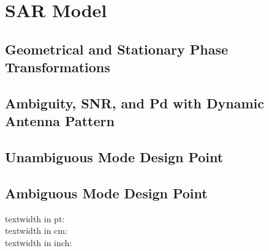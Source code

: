 \documentclass[11pt, a4paper]{scrartcl}
\begin{document}
    \section{SAR Model}
    \label{sec:sar_model}

    \subsection{Geometrical and Stationary Phase Transformations}
    \label{subsec:transformations}

    \subsection{Ambiguity, SNR, and Pd with Dynamic Antenna Pattern}
    \label{subsec:ambiguity_snr_pd_with_dynamic_antenna_pattern}

    \subsection{Unambiguous Mode Design Point}
    \label{subsec:unambiguous_mode_design_point}

    \subsection{Ambiguous Mode Design Point}
    \label{subsec:ambiguous_mode_design_point}

    
    

    textwidth in pt: \the\textwidth \\
    textwidth in cm: \prntlen{\textwidth}\\
    textwidth in inch: \prntlen{\textwidth}\\
\end{document}
